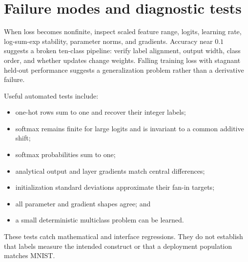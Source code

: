 \section{Failure modes and diagnostic tests}

When loss becomes nonfinite, inspect scaled feature range, logits, learning
rate, log-sum-exp stability, parameter norms, and gradients. Accuracy near
$0.1$ suggests a broken ten-class pipeline: verify label alignment, output
width, class order, and whether updates change weights. Falling training loss
with stagnant held-out performance suggests a generalization problem rather
than a derivative failure.

Useful automated tests include:
\begin{itemize}
  \item one-hot rows sum to one and recover their integer labels;
  \item softmax remains finite for large logits and is invariant to a common
  additive shift;
  \item softmax probabilities sum to one;
  \item analytical output and layer gradients match central differences;
  \item initialization standard deviations approximate their fan-in targets;
  \item all parameter and gradient shapes agree; and
  \item a small deterministic multiclass problem can be learned.
\end{itemize}

These tests catch mathematical and interface regressions. They do not establish
that labels measure the intended construct or that a deployment population
matches MNIST.

